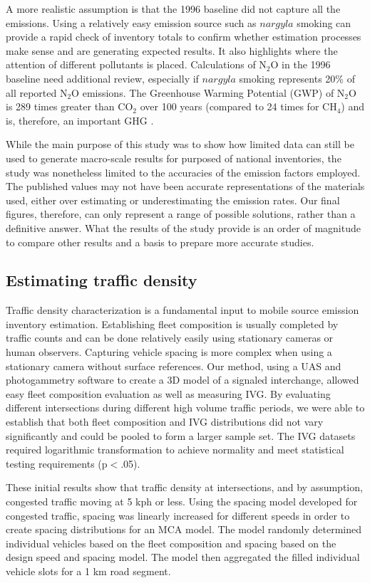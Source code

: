 A more realistic assumption is that the 1996 baseline did not capture all the emissions. Using a relatively easy emission source such as $nargyla$ smoking can provide a rapid check of inventory totals to confirm whether estimation processes make sense and are generating expected results. It also highlights where the attention of different pollutants is placed.  Calculations of N$_{2}$O in the 1996 baseline need additional review, especially if $nargyla$ smoking represents 20\% of all reported N$_{2}$O emissions.  The Greenhouse Warming Potential (GWP) of N$_{2}$O is 289 times greater than CO$_{2}$ over 100 years (compared to 24 times for CH$_{4}$)  and is, therefore, an important GHG \citep{IPCC2007}.

While the main purpose of this study was to show how limited data can still be used to generate macro-scale results for purposed of national inventories, the study was nonetheless limited to the accuracies of the emission factors employed.  The published values may not have been accurate representations of the materials used, either over estimating or underestimating the emission rates. Our final figures, therefore, can only represent a range of possible solutions, rather than a definitive answer.  What the results of the study provide is an order of magnitude to compare other results and a basis to prepare more accurate studies.

\subsection{Estimating traffic density}
Traffic density characterization is a fundamental input to mobile source emission inventory estimation. Establishing fleet composition is usually completed by traffic counts and can be done relatively easily using stationary cameras or human observers. Capturing vehicle spacing is more complex when using a stationary camera without surface references. Our method, using a UAS and photogammetry software to create a 3D model of a signaled interchange, allowed easy fleet composition evaluation as well as measuring IVG. By evaluating different intersections during different high volume traffic periods, we were able to establish that both fleet composition and IVG distributions did not vary significantly and could be pooled to form a larger sample set. The IVG datasets required logarithmic transformation to achieve normality and meet statistical testing requirements (p$<$.05).

These initial results show that traffic density at intersections, and by assumption, congested traffic moving at 5 kph or less. Using the spacing model developed for congested traffic, spacing was linearly increased for different speeds in order to create spacing distributions for an MCA model. The model randomly determined individual vehicles based on the fleet composition and spacing based on the design speed and spacing model. The model then aggregated the filled individual vehicle slots for a 1 km road segment. 

